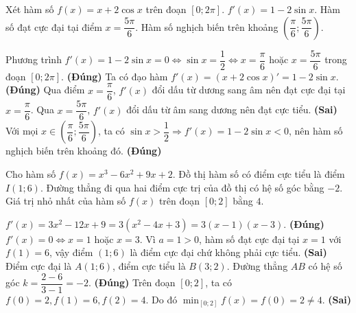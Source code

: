 \begin{ex}
Xét hàm số $f(x) = x + 2\cos x$ trên đoạn $[0; 2\pi]$.
{\True $f'(x) = 1 - 2\sin x$.}
{Hàm số đạt cực đại tại điểm $x = \dfrac{5\pi}{6}$.}
{\True Hàm số nghịch biến trên khoảng $\left(\dfrac{\pi}{6}; \dfrac{5\pi}{6}\right)$.}
\begin{loigiai}
\begin{itemchoice}
    \itemch Phương trình $f'(x) = 1 - 2\sin x = 0 \Leftrightarrow \sin x = \dfrac{1}{2} \Leftrightarrow x = \dfrac{\pi}{6}$ hoặc $x = \dfrac{5\pi}{6}$ trong đoạn $[0; 2\pi]$. \textbf{(Đúng)}
    \itemch Ta có đạo hàm $f'(x) = (x + 2\cos x)' = 1 - 2\sin x$. \textbf{(Đúng)}
    \itemch Qua điểm $x = \dfrac{\pi}{6}$, $f'(x)$ đổi dấu từ dương sang âm nên đạt cực đại tại $x = \dfrac{\pi}{6}$. Qua $x = \dfrac{5\pi}{6}$, $f'(x)$ đổi dấu từ âm sang dương nên đạt cực tiểu. \textbf{(Sai)}
    \itemch Với mọi $x \in \left(\dfrac{\pi}{6}; \dfrac{5\pi}{6}\right)$, ta có $\sin x > \dfrac{1}{2} \Rightarrow f'(x) = 1 - 2\sin x < 0$, nên hàm số nghịch biến trên khoảng đó. \textbf{(Đúng)}
\end{itemchoice}
\end{loigiai}
\end{ex}

\begin{ex}
Cho hàm số $f(x) = x^3 - 6x^2 + 9x + 2$.
{Đồ thị hàm số có điểm cực tiểu là điểm $I(1; 6)$.}
{\True Đường thẳng đi qua hai điểm cực trị của đồ thị có hệ số góc bằng $-2$.}
{Giá trị nhỏ nhất của hàm số $f(x)$ trên đoạn $[0; 2]$ bằng $4$.}
\begin{loigiai}
\begin{itemchoice}
    \itemch $f'(x) = 3x^2 - 12x + 9 = 3(x^2 - 4x + 3) = 3(x-1)(x-3)$. \textbf{(Đúng)}
    \itemch $f'(x) = 0 \Leftrightarrow x = 1$ hoặc $x = 3$. Vì $a = 1 > 0$, hàm số đạt cực đại tại $x = 1$ với $f(1) = 6$, vậy điểm $(1; 6)$ là điểm cực đại chứ không phải cực tiểu. \textbf{(Sai)}
    \itemch Điểm cực đại là $A(1; 6)$, điểm cực tiểu là $B(3; 2)$. Đường thẳng $AB$ có hệ số góc $k = \dfrac{2 - 6}{3 - 1} = -2$. \textbf{(Đúng)}
    \itemch Trên đoạn $[0; 2]$, ta có $f(0) = 2, f(1) = 6, f(2) = 4$. Do đó $\min_{[0; 2]} f(x) = f(0) = 2 \neq 4$. \textbf{(Sai)}
\end{itemchoice}
\end{loigiai}
\end{ex}

